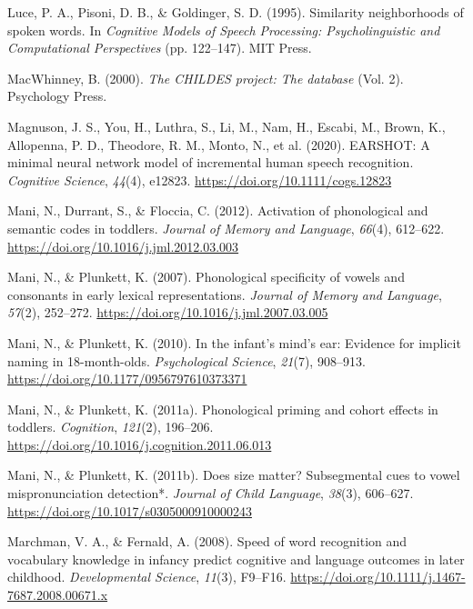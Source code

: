 \documentclass[
  12pt,
  b5paperpaper,
  twoside]{scrreprt}
\newlength{\cslhangindent}
\newlength{\cslentryspacingunit} %
\newenvironment{CSLReferences}[2] %
 {%
  \setlength{\parindent}{0pt}
  \ifodd #1
  \let\oldpar\par
  \def\par{\hangindent=\cslhangindent\oldpar}
  \fi
  \setlength{\parskip}{#2\cslentryspacingunit}
 }%
 {}
\begin{document}
\begin{CSLReferences}{1}{0}
\leavevmode{}%
Luce, P. A., Pisoni, D. B., \& Goldinger, S. D. (1995). Similarity
neighborhoods of spoken words. In \emph{Cognitive {Models} of {Speech
Processing}: {Psycholinguistic} and {Computational Perspectives}} (pp.
122--147). {MIT Press}.

\leavevmode{}%
MacWhinney, B. (2000). \emph{The {CHILDES} project: The database} (Vol.
2). {Psychology Press}.

\leavevmode{}%
Magnuson, J. S., You, H., Luthra, S., Li, M., Nam, H., Escabi, M.,
Brown, K., Allopenna, P. D., Theodore, R. M., Monto, N., et al. (2020).
{EARSHOT}: A minimal neural network model of incremental human speech
recognition. \emph{Cognitive Science}, \emph{44}(4), e12823.
\url{https://doi.org/10.1111/cogs.12823}

\leavevmode{}%
Mani, N., Durrant, S., \& Floccia, C. (2012). Activation of phonological
and semantic codes in toddlers. \emph{Journal of Memory and Language},
\emph{66}(4), 612--622. \url{https://doi.org/10.1016/j.jml.2012.03.003}

\leavevmode{}%
Mani, N., \& Plunkett, K. (2007). Phonological specificity of vowels and
consonants in early lexical representations. \emph{Journal of Memory and
Language}, \emph{57}(2), 252--272.
\url{https://doi.org/10.1016/j.jml.2007.03.005}

\leavevmode{}%
Mani, N., \& Plunkett, K. (2010). In the infant's mind's ear: Evidence
for implicit naming in 18-month-olds. \emph{Psychological Science},
\emph{21}(7), 908--913. \url{https://doi.org/10.1177/0956797610373371}

\leavevmode{}%
Mani, N., \& Plunkett, K. (2011a). Phonological priming and cohort
effects in toddlers. \emph{Cognition}, \emph{121}(2), 196--206.
\url{https://doi.org/10.1016/j.cognition.2011.06.013}

\leavevmode{}%
Mani, N., \& Plunkett, K. (2011b). Does size matter? {Subsegmental} cues
to vowel mispronunciation detection*. \emph{Journal of Child Language},
\emph{38}(3), 606--627. \url{https://doi.org/10.1017/s0305000910000243}

\leavevmode{}%
Marchman, V. A., \& Fernald, A. (2008). Speed of word recognition and
vocabulary knowledge in infancy predict cognitive and language outcomes
in later childhood. \emph{Developmental Science}, \emph{11}(3), F9--F16.
\url{https://doi.org/10.1111/j.1467-7687.2008.00671.x}


\end{CSLReferences}
\end{document}
